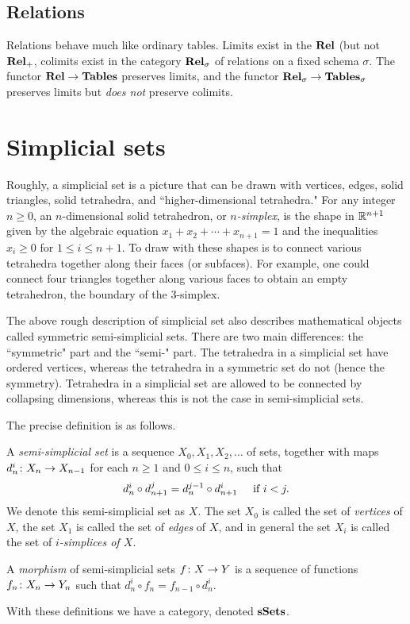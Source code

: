 \documentclass{amsart}
\def\Tables{{\bf Tables}}
\def\Rel{{\bf Rel}}
\begin{document}
\subsection{Relations}

Relations behave much like ordinary tables.  Limits exist in the $\Rel$ (but not $\Rel_+$, colimits exist in the category $\Rel_\sigma$ of relations on a fixed schema $\sigma$.  The functor $\Rel\to\Tables$ preserves limits, and the functor $\Rel_\sigma\to\Tables_\sigma$ preserves limits but {\em does not} preserve colimits.

\section{Simplicial sets}

Roughly, a simplicial set is a picture that can be drawn with vertices, edges, solid triangles, solid tetrahedra, and ``higher-dimensional tetrahedra."  For any integer $n\geq 0$, an $n$-dimensional solid tetrahedron, or {\em $n$-simplex}, is the shape in ${\mathbb R}^{n+1}$ given by the algebraic equation $x_1+x_2+\cdots+x_{n+1}=1$ and the inequalities $x_i\geq 0$ for $1\leq i\leq n+1$.  To draw with these shapes is to connect various tetrahedra together along their faces (or subfaces).  For example, one could connect four triangles together along various faces to obtain an empty tetrahedron, the boundary of the 3-simplex.

The above rough description of simplicial set also describes mathematical objects called symmetric semi-simplicial sets.  There are two main differences: the ``symmetric" part and the ``semi-" part.  The tetrahedra in a simplicial set have ordered vertices, whereas the tetrahedra in a symmetric set do not (hence the symmetry).  Tetrahedra in a simplicial set are allowed to be connected by collapsing dimensions, whereas this is not the case in semi-simplicial sets.  



The precise definition is as follows.

\begin{definition}\label{def:sSets}

A {\em semi-simplicial set} is a sequence $X_0,X_1,X_2,\ldots$ of sets, together with maps $d_n^i\colon X_n\rightarrow X_{n-1}$ for each $n\geq 1$ and $0\leq i\leq n$, such that $$d_n^i\circ d_{n+1}^j=d_n^{j-1}\circ d_{n+1}^i \hspace{.15in}\textnormal{ if } i<j.$$  We denote this semi-simplicial set as $X$.  The set $X_0$ is called the set of {\em vertices} of $X$, the set $X_1$ is called the set of {\em edges} of $X$, and in general the set $X_i$ is called the set of {\em $i$-simplices of $X$.}

A {\em morphism} of semi-simplicial sets $f\colon X\rightarrow Y$ is a sequence of functions $f_n\colon X_n\rightarrow Y_n$ such that $d_n^i\circ f_n=f_{n-1}\circ d_n^i$. 

With these definitions we have a category, denoted ${\bf sSets}$.

\end{definition}
\end{document}

